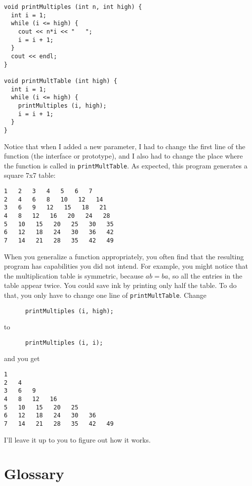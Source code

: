 \begin{lstlisting}
void printMultiples (int n, int high) {
  int i = 1;
  while (i <= high) {
    cout << n*i << "   ";
    i = i + 1;
  }    
  cout << endl;
}

void printMultTable (int high) {
  int i = 1;
  while (i <= high) {
    printMultiples (i, high);
    i = i + 1;
  }
}
\end{lstlisting}
%
Notice that when I added a new parameter, I had to change the first
line of the function (the interface or prototype), and I also had to
change the place where the function is called in {\tt printMultTable}.
As expected, this program generates a square 7x7 table:

\begin{verbatim}
1   2   3   4   5   6   7   
2   4   6   8   10   12   14   
3   6   9   12   15   18   21   
4   8   12   16   20   24   28   
5   10   15   20   25   30   35   
6   12   18   24   30   36   42   
7   14   21   28   35   42   49
\end{verbatim}
%
When you generalize a function appropriately, you often find
that the resulting program has capabilities you did not intend.
For example, you might notice that the multiplication table
is symmetric, because $ab = ba$, so all the entries in the
table appear twice.  You could save ink by printing only
half the table.  To do that, you only have to change one
line of {\tt printMultTable}.  Change

\begin{lstlisting}
      printMultiples (i, high);
\end{lstlisting}
%
to

\begin{lstlisting}
      printMultiples (i, i);
\end{lstlisting}
%
and you get

\begin{verbatim}
1   
2   4   
3   6   9   
4   8   12   16   
5   10   15   20   25   
6   12   18   24   30   36   
7   14   21   28   35   42   49  
\end{verbatim}
%
I'll leave it up to you to figure out how it works.

\section{Glossary}

